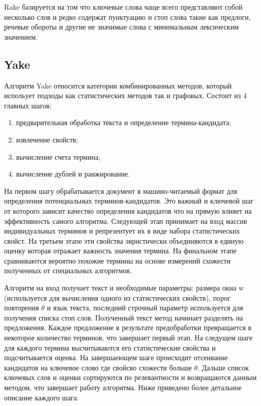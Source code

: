 Rake базируется на том что ключевые слова чаще всего представляют собой несколько слов и редко содержат пунктуацию и стоп слова такие как предлоги, речевые обороты и другие не значимые слова с минимальным лексическим значением. \cite{15}

\subsection{Yake}

Алгоритм Yake относится категории комбинированных методов, который испольует подходы как статистических методов так и графовых. 
Состоит из 4 главных шагов:

\begin{enumerate}
	\item предварительная обработка текста и определение термина-кандидата;
	\item извлечение свойств;
	\item вычисление счета термина;
	\item вычисление дублей и ранжирование.
\end{enumerate}
На первом шагу обрабатывается документ в машино-читаемый формат для определения потенциальных терминов-кандидатов.
Это важный и ключевой шаг от которого зависит качество определения кандидатов что на прямую влияет на эффективность самого алгоритма.
Следующей этап принимает на вход массив индивидуальных терминов и репрезентует их в виде набора статистических свойст.
На третьем этапе эти свойства эвристически объединяются в единую оценку которая отражает важность значения термина.
На финальном этапе сравниваются вероятно похожие термины на основе измерений схожести полученных от специальных алгоритмов.

Алгоритм на вход получает текст и необходимые параметры: размера окна w (используется для вычисления одного из статистических свойств), порог повторения $\theta$ и язык текста, последний строчный параметр используется для получения списка стоп слов.
Полученный текст метод начинает разделять на предложения.
Каждое предложение в результате предобработки превращается в некоторое количество терминов, что завершает первый этап.
На следущем шаге для каждого термина высчитываются его статистические свойства и подсчитывается оценка.
На завершаеющем шаге происходит отсеивание кандидатов на ключевое слово где свойсво схожести больше $\theta$.
Дальше список ключевых слов и оценки сортируются по релевантности и возвращаются данным методом, что завершает работу алгоритма.
Ниже приведено более детальное описание каждого шага.

